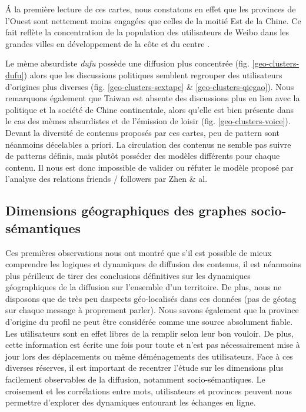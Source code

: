 \'A la première lecture de ces cartes, nous constatons en effet que les provinces de l{\textquoteright}Ouest sont nettement moins engagées que celles de la moitié Est de la Chine. Ce fait reflète la concentration de la population des utilisateurs de Weibo dans les grandes villes en développement de la c\^ote et du centre \cite{Fu2013}. 

Le mème absurdiste \textit{dufu} possède une diffusion plus concentrée (fig. \ref{geo-clusters-dufu}) alors que les discussions politiques semblent regrouper des utilisateurs d{\textquoteright}origines plus diverses (fig. \ref{geo-clusters-sextape} \& \ref{geo-clusters-qiegao}). Nous remarquons également que Taiwan est absente des discussions plus en lien avec la politique et la société de Chine continentale, alors qu{\textquoteright}elle est bien présente dans le cas des mèmes absurdistes et de l{\textquoteright}émission de loisir (fig. \ref{geo-clusters-voice}). Devant la diversité de contenus proposés par ces cartes, peu de pattern sont néanmoins décelables a priori. La circulation des contenus ne semble pas suivre de patterns définis, mais plutôt posséder des modèles différents pour chaque contenu. Il nous est donc impossible de valider ou réfuter le modèle proposé par l'analyse des relations friends / followers par Zhen \& al\citep{Zhen2013}. 

\subsection{Dimensions géographiques des graphes socio-sémantiques}

Ces premières observations nous ont montré que s{\textquoteright}il est possible de mieux comprendre les logiques et dynamiques de diffusion des contenus, il est néanmoins plus périlleux de tirer des conclusions définitives sur les dynamiques géographiques de la diffusion sur l{\textquoteright}ensemble d{\textquoteright}un territoire. De plus, nous ne disposons que de très peu d{\textquotesingle}aspects {\textquotedbl}géo-localisés{\textquotedbl} dans ces données (pas de géotag sur chaque message \`a proprement parler). Nous savons également que la province d{\textquoteright}origine du profil ne peut être considérée comme une source absolument fiable. Les utilisateurs sont en effet libres de la remplir selon leur bon vouloir. De plus, cette information est écrite une fois pour toute et n{\textquoteright}est pas nécessairement mise \`a jour lors des déplacements ou même déménagements des utilisateurs. Face \`a ces diverses réserves, il est important de recentrer l{\textquoteright}étude sur les dimensions plus facilement observables de la diffusion, notamment socio-sémantiques. Le croisement et les corrélations entre mots, utilisateurs et provinces peuvent nous permettre d'explorer des dynamiques entourant les échanges en ligne.

